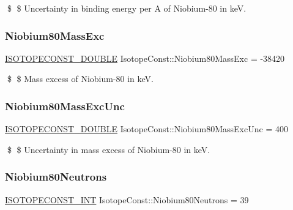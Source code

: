 \$ \$ Uncertainty in binding energy per A of Niobium-\/80 in keV. \mbox{\label{group___isotope_const-_niobium-_nb80_ga4afc2a7dd773f3ea1b5eb767651717e4}} 
\subsubsection{\texorpdfstring{Niobium80\+Mass\+Exc}{Niobium80MassExc}}
{\footnotesize\ttfamily \mbox{\hyperlink{group___isotope_const-_macros_ga8f45a7272ce02c0b4c65c44636ed719a}{I\+S\+O\+T\+O\+P\+E\+C\+O\+N\+S\+T\+\_\+\+D\+O\+U\+B\+LE}} Isotope\+Const\+::\+Niobium80\+Mass\+Exc = -\/38420}

\$ \$ Mass excess of Niobium-\/80 in keV. \mbox{\label{group___isotope_const-_niobium-_nb80_ga57517765703d595f1d437c0186fdc2ab}} 
\subsubsection{\texorpdfstring{Niobium80\+Mass\+Exc\+Unc}{Niobium80MassExcUnc}}
{\footnotesize\ttfamily \mbox{\hyperlink{group___isotope_const-_macros_ga8f45a7272ce02c0b4c65c44636ed719a}{I\+S\+O\+T\+O\+P\+E\+C\+O\+N\+S\+T\+\_\+\+D\+O\+U\+B\+LE}} Isotope\+Const\+::\+Niobium80\+Mass\+Exc\+Unc = 400}

\$ \$ Uncertainty in mass excess of Niobium-\/80 in keV. \mbox{\label{group___isotope_const-_niobium-_nb80_gafb965bc233aaf4d5f0e6096a3c56dd94}} 
\subsubsection{\texorpdfstring{Niobium80\+Neutrons}{Niobium80Neutrons}}
{\footnotesize\ttfamily \mbox{\hyperlink{group___isotope_const-_macros_ga5f18360b3e99483a35c32d789e62621c}{I\+S\+O\+T\+O\+P\+E\+C\+O\+N\+S\+T\+\_\+\+I\+NT}} Isotope\+Const\+::\+Niobium80\+Neutrons = 39}

